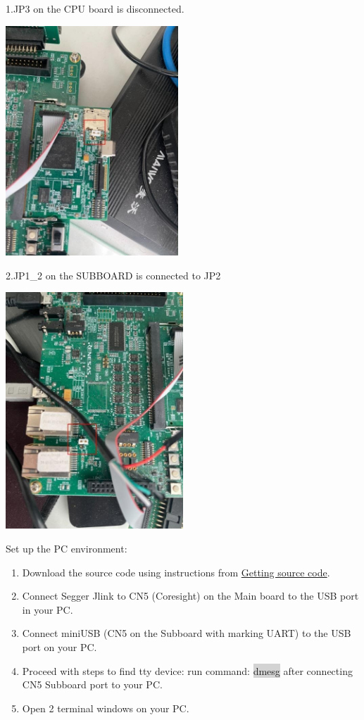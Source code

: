 \documentclass[11pt,a4paper,oneside]{article}
\begin{document}
1.JP3 on the CPU board is disconnected.

\includegraphics[width=2.55208in,height=3.40278in]{./media/image.jpg}

2.JP1\_2 on the SUBBOARD is connected to JP2

\includegraphics[width=2.625in,height=3.5in]{./media/image2.jpg}

Set up the PC environment:

\begin{enumerate}
\def\labelenumi{\arabic{enumi}.}
\item
  Download the source code using instructions from
  \hyperref[gettig-source-code]{Getting source code}.
\item
  Connect Segger Jlink to CN5 (Coresight) on the Main board to the USB
  port in your PC.
\item
  Connect miniUSB (CN5 on the Subboard with marking UART) to the USB
  port on your PC.
\item
  Proceed with steps to find tty device: run command:
  \colorbox{lightgray}{dmesg} after connecting CN5 Subboard port to your PC.
\item
  Open 2 terminal windows on your PC.
\end{enumerate}
\end{document}
